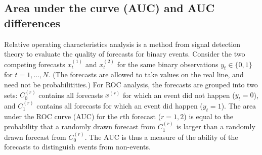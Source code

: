 \documentclass[article]{jss}\usepackage{graphicx, color}
\begin{document}
\subsection{Area under the curve (AUC) and AUC differences}

Relative operating characteristics \citep[ROC, ][and references therein]{mason2002areas} analysis is a method from signal detection theory to evaluate the quality of forecasts for binary events.
Consider the two competing forecasts $x^{(1)}_t$ and $x^{(2)}_t$ for the same binary observations $y_t \in \{0, 1\}$ for $t=1,\dots,N$.
(The forecasts are allowed to take values on the real line, and need not be probabilitities.)
For ROC analysis, the forecasts are grouped into two sets: $C^{(r)}_0$ contains all forecasts $x^{(r)}$ for which an event did not happen ($y_t=0$), and $C^{(r)}_1$ contains all forecasts for which an event did happen ($y_t = 1$).
The area under the ROC curve (AUC) for the $r$th forecast ($r=1,2$) is equal to the probability that a randomly drawn forecast from $C^{(r)}_1$ is larger than a randomly drawn forecast from $C^{(r)}_0$.
The AUC is thus a measure of the ability of the forecasts to distinguish events from non-events.
\end{document}
